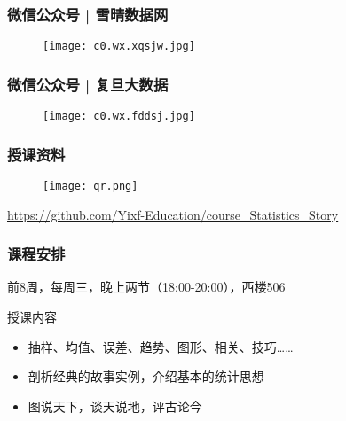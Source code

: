\begin{frame}
  \frametitle{微信公众号 | 雪晴数据网}
  \begin{figure}
    \centering
    \texttt{[image: c0.wx.xqsjw.jpg]}
  \end{figure}
\end{frame}
\begin{frame}
  \frametitle{微信公众号 | 复旦大数据}
  \begin{figure}
    \centering
    \texttt{[image: c0.wx.fddsj.jpg]}
  \end{figure}
\end{frame}

\begin{frame}
  \frametitle{授课资料}
  \begin{figure}
    \centering
    \texttt{[image: qr.png]}
  \end{figure}
  \begin{center}
    \href{https://github.com/Yixf-Education/course_Statistics_Story}{https://github.com/Yixf-Education/course\_Statistics\_Story}
  \end{center}
\end{frame}


\begin{frame}
  \frametitle{课程安排}
  \begin{center}
  \alert{前8周，每周三，晚上两节（18:00-20:00），西楼506}\\
  \vspace{0.2cm}
  \end{center}
  \begin{block}{授课内容}
    \begin{itemize}
      \item 抽样、均值、误差、趋势、图形、相关、技巧……
      \item 剖析经典的故事实例，介绍基本的统计思想
      \item 图说天下，谈天说地，评古论今
    \end{itemize}
  \end{block}
\end{frame}

